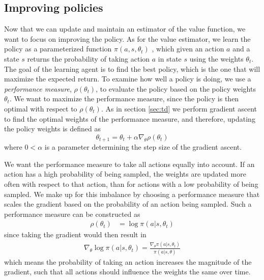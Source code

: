 \documentclass[11pt]{article}
\begin{document}
\subsection{Improving policies}
\label{sec:improv}
Now that we can update and maintain an estimator of the value function, we want
to focus on improving the policy.
As for the value estimator, we learn the policy as a parameterized function $\pi(a, s, \theta_t)$
, which given an action $a$ and a state $s$ returns the probability
of taking action $a$ in state $s$ using the weights $\theta_t$.
The goal of the learning agent is to find the best policy, which is the one 
that will maximize the expected return.
To examine how well a policy is doing, we use a \textit{performance measure}, $\rho(\theta_t)$, to evaluate
the policy based on the policy weights $\theta_t$.
We want to maximize the performance measure, since the policy is then optimal with
respect to $\rho(\theta_t)$.
As in section \ref{sec:td}
we perform gradient ascent to find the optimal weights of the performance measure,
and therefore, updating the policy weights is defined as
\begin{equation}
    \theta_{t+1} = \theta_t + \alpha \nabla_{\theta} \rho(\theta_t)
\end{equation}
where $0 < \alpha$ is a parameter determining the step size of the gradient ascent.

We want the performance measure to take all actions equally into account.
If an action has a high probability of being sampled, the weights are
updated more often with respect to that action, than for actions with a low probability of being sampled.
We make up for this imbalance by choosing a performance measure
that scales the gradient based on the probability of an action being sampled.
Such a performance measure can be constructed as
\begin{equation}
    \begin{aligned}
        \rho(\theta_t) & = \log\pi(a|s, \theta_t)
    \end{aligned}
\end{equation}
since taking the gradient would then result in
\begin{equation}\label{per_mes}
    \begin{aligned}
        \nabla_{\theta} \log\pi(a|s, \theta_t) = \frac{\nabla_{\theta}\pi(a|s, \theta_t)}{\pi(a|s,\theta)}
    \end{aligned}
\end{equation}
which means the probability of taking an action increases the magnitude of the gradient,
such that all actions should influence the weights the same over time.
\end{document}
